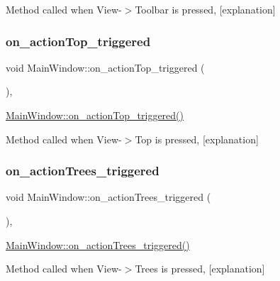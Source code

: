 Method called when View-\/$>$Toolbar is pressed, \mbox{[}explanation\mbox{]} \mbox{\label{class_main_window_a12c196357f488415909efd293a2bf6d0}} 
\subsubsection{\texorpdfstring{on\+\_\+action\+Top\+\_\+triggered}{on\_actionTop\_triggered}}
{\footnotesize\ttfamily void Main\+Window\+::on\+\_\+action\+Top\+\_\+triggered (\begin{DoxyParamCaption}{ }\end{DoxyParamCaption})\hspace{0.3cm}{\ttfamily [private]}, {\ttfamily [slot]}}



\hyperlink{class_main_window_a12c196357f488415909efd293a2bf6d0}{Main\+Window\+::on\+\_\+action\+Top\+\_\+triggered()} 

Method called when View-\/$>$Top is pressed, \mbox{[}explanation\mbox{]} \mbox{\label{class_main_window_ab29f6867e27f4f7bbb30eb31d7a152d2}} 
\subsubsection{\texorpdfstring{on\+\_\+action\+Trees\+\_\+triggered}{on\_actionTrees\_triggered}}
{\footnotesize\ttfamily void Main\+Window\+::on\+\_\+action\+Trees\+\_\+triggered (\begin{DoxyParamCaption}{ }\end{DoxyParamCaption})\hspace{0.3cm}{\ttfamily [private]}, {\ttfamily [slot]}}



\hyperlink{class_main_window_ab29f6867e27f4f7bbb30eb31d7a152d2}{Main\+Window\+::on\+\_\+action\+Trees\+\_\+triggered()} 

Method called when View-\/$>$Trees is pressed, \mbox{[}explanation\mbox{]} \mbox{\label{class_main_window_abbab7cd8683132f28cf976d069c7c448}} 
